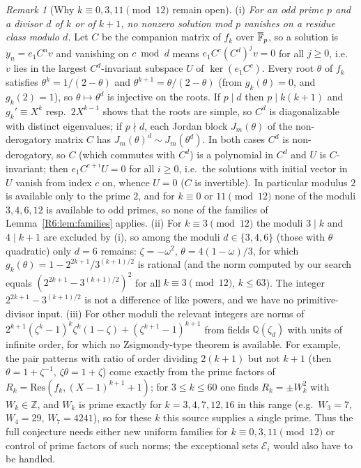 \documentclass[11pt]{amsart}
\theoremstyle{definition}
\theoremstyle{remark}
\newtheorem{remark}[theorem]{Remark}
\providecommand{\Q}{\mathbb Q}
\providecommand{\Z}{\mathbb Z}
\begin{document}
\begin{remark}[Why $k\equiv0,3,11\pmod{12}$ remain open]\label{R6:rem:obstruction}
(i) \emph{For an odd prime $p$ and a divisor $d$ of $k$ or of $k+1$, no nonzero solution mod $p$
vanishes on a residue class modulo $d$.} Let $C$ be the companion matrix of $f_k$ over
$\overline{\mathbb{F}}_p$, so a solution is $y_n=e_1C^nv$ and vanishing on $c\bmod d$ means
$e_1C^c(C^d)^jv=0$ for all $j\ge0$, i.e.\ $v$ lies in the largest $C^d$-invariant subspace $U$ of
$\ker(e_1C^c)$. Every root $\theta$ of $f_k$ satisfies $\theta^k=1/(2-\theta)$ and
$\theta^{k+1}=\theta/(2-\theta)$ (from $g_k(\theta)=0$, and $g_k(2)=1$), so $\theta\mapsto\theta^d$ is
injective on the roots. If $p\mid d$ then $p\mid k(k+1)$ and $g_k'\equiv X^k$ resp.\ $2X^{k-1}$ shows that
the roots are simple, so $C^d$ is diagonalizable with distinct eigenvalues; if $p\nmid d$, each Jordan
block $J_m(\theta)$ of the non-derogatory matrix $C$ has $J_m(\theta)^d\sim J_m(\theta^d)$. In both cases
$C^d$ is non-derogatory, so $C$ (which commutes with $C^d$) is a polynomial in $C^d$ and $U$ is
$C$-invariant; then $e_1C^{c+i}U=0$ for all $i\ge0$, i.e.\ the solutions with initial vector in $U$
vanish from index $c$ on, whence $U=0$ ($C$ is invertible). In particular modulus $2$ is available only
to the prime $2$, and for $k\equiv0$ or $11\pmod{12}$ none of the moduli $3,4,6,12$ is available to odd
primes, so none of the families of Lemma~\ref{R6:lem:families} applies.
(ii) For $k\equiv3\pmod{12}$ the moduli $3\mid k$ and $4\mid k+1$ are excluded by (i), so among the
moduli $d\in\{3,4,6\}$ (those with $\theta$ quadratic) only $d=6$ remains: $\zeta=-\omega^2$,
$\theta=4(1-\omega)/3$, for which $g_k(\theta)=1-2^{2k+1}/3^{(k+1)/2}$ is rational (and the norm computed by our search equals
$(2^{2k+1}-3^{(k+1)/2})^2$ for all $k\equiv3\pmod{12}$, $k\le63$). The integer
$2^{2k+1}-3^{(k+1)/2}$ is not a difference of like powers, and we have no primitive-divisor input.
(iii) For other moduli the relevant integers are norms of
$2^{k+1}(\zeta^k-1)^k\zeta^k(1-\zeta)+(\zeta^{k+1}-1)^{k+1}$ from fields $\Q(\zeta_d)$ with units of
infinite order, for which no Zsigmondy-type theorem is available. For example, the pair patterns with
ratio of order dividing $2(k+1)$ but not $k+1$ (then $\theta=1+\zeta^{-1}$, $\zeta\theta=1+\zeta$)
come exactly from the prime factors of $R_k=\mathrm{Res}(f_k,(X-1)^{k+1}+1)$; for $3\le k\le60$ one
finds $R_k=\pm W_k^2$ with $W_k\in\Z$, and $W_k$ is prime exactly for $k=3,4,7,12,16$ in this range
(e.g.\ $W_3=7$, $W_4=29$, $W_7=4241$), so for these $k$ this source supplies a single prime.
Thus the full conjecture needs either new uniform families for $k\equiv0,3,11\pmod{12}$ or control of
prime factors of such norms; the exceptional sets $\mathcal E_i$ would also have to be handled.
\end{remark}
\end{document}
